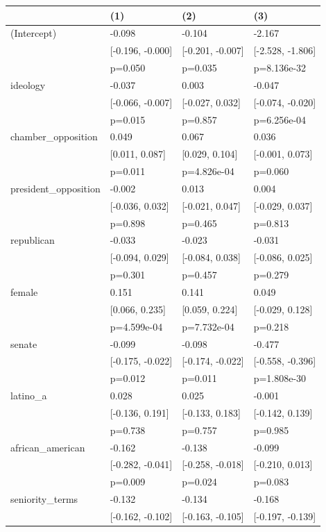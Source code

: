 \begin{tabular}{llll}
\hline
& (1) & (2) & (3) \\ \hline
(Intercept) & -0.098 & -0.104 & -2.167 \\
& [-0.196, -0.000] & [-0.201, -0.007] & [-2.528, -1.806] \\
& p=0.050 & p=0.035 & p=8.136e-32 \\
ideology & -0.037 & 0.003 & -0.047 \\
& [-0.066, -0.007] & [-0.027, 0.032] & [-0.074, -0.020] \\
& p=0.015 & p=0.857 & p=6.256e-04 \\
chamber_opposition & 0.049 & 0.067 & 0.036 \\
& [0.011, 0.087] & [0.029, 0.104] & [-0.001, 0.073] \\
& p=0.011 & p=4.826e-04 & p=0.060 \\
president_opposition & -0.002 & 0.013 & 0.004 \\
& [-0.036, 0.032] & [-0.021, 0.047] & [-0.029, 0.037] \\
& p=0.898 & p=0.465 & p=0.813 \\
republican & -0.033 & -0.023 & -0.031 \\
& [-0.094, 0.029] & [-0.084, 0.038] & [-0.086, 0.025] \\
& p=0.301 & p=0.457 & p=0.279 \\
female & 0.151 & 0.141 & 0.049 \\
& [0.066, 0.235] & [0.059, 0.224] & [-0.029, 0.128] \\
& p=4.599e-04 & p=7.732e-04 & p=0.218 \\
senate & -0.099 & -0.098 & -0.477 \\
& [-0.175, -0.022] & [-0.174, -0.022] & [-0.558, -0.396] \\
& p=0.012 & p=0.011 & p=1.808e-30 \\
latino_a & 0.028 & 0.025 & -0.001 \\
& [-0.136, 0.191] & [-0.133, 0.183] & [-0.142, 0.139] \\
& p=0.738 & p=0.757 & p=0.985 \\
african_american & -0.162 & -0.138 & -0.099 \\
& [-0.282, -0.041] & [-0.258, -0.018] & [-0.210, 0.013] \\
& p=0.009 & p=0.024 & p=0.083 \\
seniority_terms & -0.132 & -0.134 & -0.168 \\
& [-0.162, -0.102] & [-0.163, -0.105] & [-0.197, -0.139] \\

\end{tabular}
